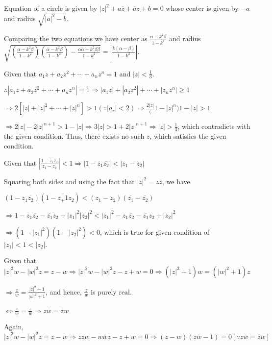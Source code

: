   Equation of a circle is given by $|z|^2 + a\overline{z} + \overline{a}z + b = 0$ whose center is given by
  $-a$ and radius $\sqrt{|a|^2 - b}$.

  Comparing the two equations we have center as $\frac{\alpha - k^2\beta}{1 - k^2}$ and radius
  $\sqrt{\left(\frac{\alpha - k^2\beta}{1 - k^2}\right)\left(\frac{\overline{\alpha} -
      k^2\overline{\beta}}{1 - k^2}\right) - \frac{\alpha\overline{\alpha} - k^2\beta\overline{\beta}}{1 -
      k^2}} = \left|\frac{k(\alpha - \beta)}{1 - k^2}\right|$.
\item Given that $a_1z + a_2z^2 + \cdots + a_nz^n = 1$ and $|z| < \frac{1}{3}$.

  $\therefore |a_1z + a_2z^2 + \cdots + a_nz^n| = 1\Rightarrow |a_1z| + |a_2z^2| + \cdots + |z_nz^n| \geq 1$

  $\Rightarrow 2[|z| + |z|^2 + \cdots + |z|^n] > 1(\because |a_r| < 2)\Rightarrow \frac{2|z|}(1 - |z|^n){1 -
  |z|} > 1$

  $\Rightarrow 2|z| - 2|z|^{n + 1} > 1 - |z| \Rightarrow 3|z| > 1 + 2|z|^{n + 1}\Rightarrow |z| >
  \frac{1}{3}$, which contradicts with the given condition. Thus, there exists no such $z$, which satisfies
  the given condition.
\item Given that $\left|\frac{1 - z_1\overline{z_2}}{z_1 - z_2}\right| < 1 \Rightarrow |1 -
  z_1\overline{z_2}| < |z_1 - z_2|$

  Squaring both sides and using the fact that $|z|^2 = z\overline{z}$, we have

  $(1 - z_1\overline{z_2})(1 - \overline{z_+1}z_2) < (z_1 - z_2)(\overline{z_1} - \overline{z_2})$

  $\Rightarrow 1 - z_1\overline{z_2} - \overline{z_1}z_2 + |z_1|^2|z_2|^2 < |z_1|^2 - z_1\overline{z_2} -
  \overline{z_1}z_2 + |z_2|^2 $

  $\Rightarrow (1 - |z_1|^2)(1 - |z_2|^2) < 0$, which is true for given condition of $|z_1| < 1 < |z_2|$.
\item Given that $|z|^2w - |w|^2z = z - w \Rightarrow |z|^2w - |w|^2z - z + w = 0 \Rightarrow (|z|^2 + 1)w =
  (|w|^2 + 1)z$

  $\Rightarrow \frac{z}{w} = \frac{|z|^2 + 1}{|w|^2 + 1}$, and hence, $\frac{z}{w}$ is purely real.


  $\Leftrightarrow \frac{z}{w} = \frac{\overline{z}}{\overline{w}} \Rightarrow z\overline{w} =
  \overline{z}w$

  Again, $|z|^2w - |w|^2z = z - w \Rightarrow z\overline{z}w - w\overline{w}z - z + w = 0 \Rightarrow (z -
  w)(z\overline{w} - 1) = 0[\because z\overline{w} = \overline{z}w]$

